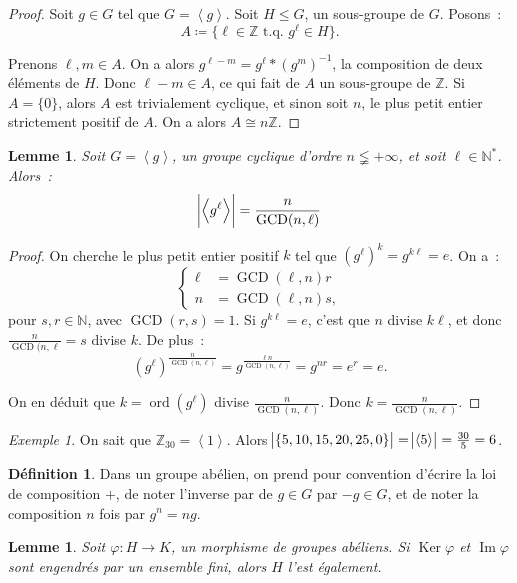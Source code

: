 \documentclass{article}
\newtheorem{lem}[thm]{Lemme}
\theoremstyle{definition}
\newtheorem{déf}[thm]{Définition}
\theoremstyle{remark}
\newtheorem{ex}{Exemple}[section]
\DeclareMathOperator{\ord}{ord}
\DeclareMathOperator{\Imf}{Im}
\DeclareMathOperator{\Ker}{Ker}
\DeclareMathOperator{\GCD}{GCD}
\newcommand{\Z}{\mathbb Z}
\newcommand{\N}{\mathbb N}
\newcommand{\tq}{\text{ t.q. }}
\newcommand{\simeqq}{\cong}
\newcommand{\eng}[1]{\left\langle#1\right\rangle}
\begin{document}
	\begin{proof} Soit $g \in G$ tel que $G = \eng g$. Soit $H \leq G$, un sous-groupe de $G$. Posons~:
	\[A \coloneqq \{\ell \in \Z \tq g^\ell \in H\}.\]

	Prenons $\ell, m \in A$. On a alors $g^{\ell-m} = g^\ell*(g^m)^{-1}$, la composition de deux éléments de $H$. Donc $\ell-m \in A$, ce qui fait de $A$ un
	sous-groupe de $\Z$. Si $A = \{0\}$, alors $A$ est trivialement cyclique, et sinon soit $n$, le plus petit entier strictement positif de $A$. On a alors
	$A \simeqq n\Z$.
	\end{proof}

	\begin{lem} Soit $G = \eng g$, un groupe cyclique d'ordre $n \lneqq +\infty$, et soit $\ell \in \N^*$. Alors~:
	\[\abs {\eng {g^\ell}} = \frac n{\GCD(n, \ell)}\]
	\end{lem}

	\begin{proof} On cherche le plus petit entier positif $k$ tel que $(g^\ell)^k = g^{k\ell} = e$. On a~:
	\[\begin{cases}
		\ell &= \GCD(\ell, n)r \\
		n &= \GCD(\ell, n)s,
	\end{cases}\]
	pour $s, r \in \N$, avec $\GCD(r, s) = 1$. Si $g^{k\ell} = e$, c'est que $n$ divise $k\ell$, et donc $\frac n{\GCD(n, \ell} = s$ divise $k$. De plus~:
	\[\left(g^{\ell}\right)^{\frac n{\GCD(n, \ell)}} = g^{\frac {\ell n}{\GCD(n, \ell)}} = g^{nr} = e^r = e.\]

	On en déduit que $k = \ord(g^\ell)$ divise $\frac n{\GCD(n, \ell)}$. Donc $k = \frac n{\GCD(n, \ell)}$.
	\end{proof}

	\begin{ex} On sait que $\Z_{30} = \eng {1}$. Alors $\abs {\{5, 10, 15, 20, 25, 0\}} = \abs {\eng 5} = \frac {30}5 = 6$.
	\end{ex}

	\begin{déf} Dans un groupe abélien, on prend pour convention d'écrire la loi de composition $+$, de noter l'inverse par de $g \in G$ par $-g \in G$, et
	de noter la composition $n$ fois par $g^n = ng$.
	\end{déf}

	\begin{lem} Soit $\varphi : H \to K$, un morphisme de groupes abéliens. Si $\Ker \varphi$ et $\Imf \varphi$ sont engendrés par un ensemble fini, alors $H$
	l'est également.
	\end{lem}
\end{document}
